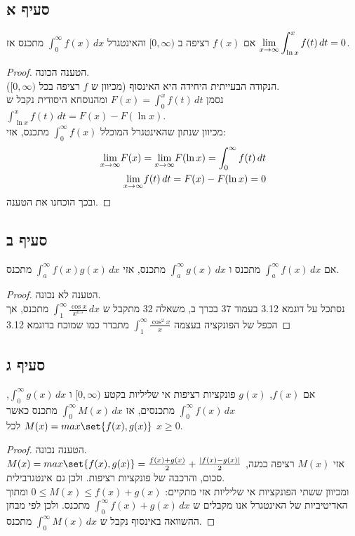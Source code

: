\documentclass{article}
\DeclarePairedDelimiter\set\{\}
\begin{document}
	\subsection*{סעיף א}
	אם $f(x)$ רציפה ב $[0, \infty)$ והאינטגרל $\int_0^\infty f(x) \, dx$ מתכנס אז $\displaystyle{\lim_{x \to \infty}} \int_{\ln x}^x f(t) \, dt = 0$.

	\begin{proof}
		הטענה הכונה. \\
		הנקודה הבעייתית היחידה היא האינסוף (מכיוון ש $f$ רציפה בכל $[0, \infty)$). \\
		נסמן $F(x) = \int_0^x f(t) \, dt$ ומהנוסחא היסודית נקבל ש $\int_{\ln x}^x f(t) \, dt = F(x) - F(\ln x)$. \\
		מכיוון שנתון שהאינטגרל המוכלל $\int_0^\infty f(x)$ מתכנס, אזי:
		\begin{align*}
			\displaystyle{\lim_{x \to \infty}} F(x) = \displaystyle{\lim_{x \to \infty}} F(\ln x) = \int_0^\infty f(t) \, dt \\
			\displaystyle{\lim_{x \to \infty}} f(t) \, dt = F(x) - F(\ln x) = 0
		\end{align*}
		ובכך הוכחנו את הטענה.
	\end{proof}

	\subsection*{סעיף ב}
	אם $\int_a^\infty f(x) \, dx$ מתכנס ו $\int_a^\infty g(x) \, dx$ מתכנס, אזי $\int_a^\infty f(x) g(x) \, dx$ מתכנס.
	\begin{proof}
		הטענה לא נכונה. \\
		נסתכל על דוגמא 3.12 בעמוד 37 בכרך ב, משאלה 32 מתקבל ש $\int_1^\infty \frac{\cos x}{x^{0.5}} \, dx$ מתכנס, אך הכפל של הפונקציה בעצמה $\int_1^\infty \frac{\cos^2 x}{x}$ מתבדר כמו שמוכח בדוגמא 3.12
	\end{proof}

	\subsection*{סעיף ג}
	אם $f(x)$, $g(x)$ פונקציות רציפות אי שליליות בקטע $[0, \infty)$ ו
	$\int_0^\infty g(x) \, dx$, $\int_0^\infty f(x) \, dx$ מתכנסים, אז $\int_0^\infty M(x) \, dx$ מתכנס כאשר $M(x) = max \set{f(x), g(x)}$ לכל $x \geq 0$.

	\begin{proof}
		הטענה נכונה. \\
		$M(x) = max \set{f(x), g(x)} = \frac{f(x) + g(x)}{2} + \frac{\pip{f(x) - g(x)}}{2}$ אזי $M(x)$ רציפה כמנה, סכום, והרכבה של פונקציות רציפות.
		ולכן גם אינטגרבילית. \\
		ומכיוון ששתי הפונקציות אי שליליות אזי מתקיים: $0 \leq M(x) \leq f(x) + g(x)$ ומתוך האדיטיביות של האינטגרל אנו מקבלים ש $\int_0^\infty f(x) + g(x) \, dx$ מתכנס.
		ולכן לפי מבחן ההשוואה באינסוף נקבל ש $\int_0^\infty M(x) \, dx$ מתכנס.
	\end{proof}
\end{document}

